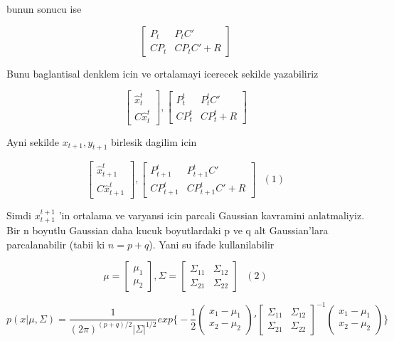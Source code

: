 \documentclass[12pt,fleqn]{article}\usepackage{../common}
\begin{document}
bunun sonucu ise

\[ 
\left[\begin{array}{rr}
P_t & P_t C' \\
CP_t & CP_tC' + R
\end{array}\right]
 \]

Bunu baglantisal denklem icin ve ortalamayi icerecek sekilde yazabiliriz

\[ 
\left[\begin{array}{r}
\hat{x}_t^t \\
C\hat{x}_t^t
\end{array}\right] 
, 
\left[\begin{array}{rr}
P_t^t & P_t^tC' \\
CP_t^t & CP_t^t + R
\end{array}\right]
 \]

Ayni sekilde $x_{t+1} , y_{t+1}$ birlesik dagilim icin

\[
\left[\begin{array}{r}
\hat{x}_{t+1}^t \\
C\hat{x}_{t+1}^t
\end{array}\right], 
\left[\begin{array}{rr}
P_{t+1}^t & P_{t+1}^tC' \\
CP_{t+1}^t & CP_{t+1}^tC' + R
\end{array}\right] \ \ \ (1)
\]

Simdi $x_{t+1}^{t+1}$ 'in ortalama ve varyansi icin parcali Gaussian kavramini
anlatmaliyiz. Bir n boyutlu Gaussian daha kucuk boyutlardaki p ve q alt
Gaussian'lara parcalanabilir (tabii ki $n = p + q$). Yani su ifade
kullanilabilir

\[
\mu = 
\left[\begin{array}{r}
\mu_1 \\ \mu_2
\end{array}\right], 
\Sigma = 
\left[\begin{array}{rr}
\Sigma_{11} & \Sigma_{12} \\
\Sigma_{21} & \Sigma_{22} 
\end{array}\right]
\ \ \ (2)
\]

\[ 
p(x|\mu,\Sigma) = 
\frac{1}{(2\pi)^{(p+q)/2}|\Sigma|^{1/2}}
exp \bigg\{ 
-\frac{1}{2} 
\left(\begin{array}{rr}
x_1 - \mu_1 \\
x_2 - \mu_2 
\end{array}\right)'
\left[\begin{array}{rr}
\Sigma_{11} & \Sigma_{12} \\
\Sigma_{21} & \Sigma_{22} 
\end{array}\right]^{-1}
\left(\begin{array}{rr}
x_1 - \mu_1 \\
x_2 - \mu_2 
\end{array}\right)
\bigg\}
 \]
\end{document}
